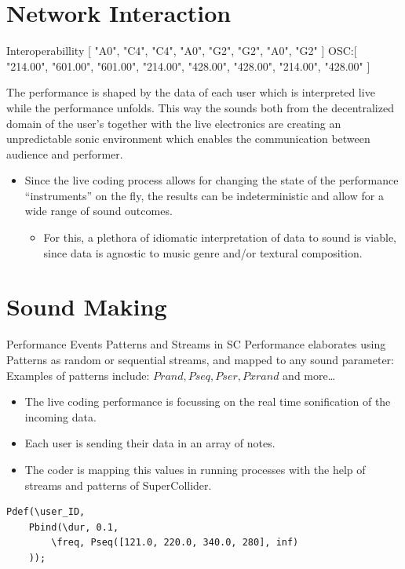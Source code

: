 \documentclass[t, 10pt, seahorse, bigger]{beamer}
\begin{document}
\section{Network Interaction}
\label{sec:orgc9b9663}
\begin{frame}[label={sec:org68b94df}]{Interoperabillity}
[ "A0", "C4", "C4", "A0", "G2", "G2", "A0", "G2" ]
OSC:[ "214.00", "601.00", "601.00", "214.00", "428.00", "428.00", "214.00", "428.00" ]

The performance is shaped by the data of each user which is interpreted live while the performance unfolds. This way the sounds both from the decentralized domain of the user's together with the live electronics are creating an unpredictable sonic environment which enables the communication between audience and performer.

\begin{itemize}
\item Since the live coding process allows for changing the state of the performance ``instruments'' on the fly, the results can be indeterministic and allow for a wide range of sound outcomes.
\begin{itemize}
\item For this, a plethora of idiomatic interpretation of data to sound is viable, since data is agnostic to music genre and/or textural composition.
\end{itemize}
\end{itemize}
\end{frame}
\section{Sound Making}
\label{sec:org3cde542}
\begin{frame}[label={sec:org9acd6cc},fragile]{Performance Events Patterns and Streams in SC}
 Performance elaborates using Patterns as random or sequential streams, and mapped to any sound parameter:
Examples of patterns include:
\(Prand, Pseq, Pser, Pxrand\)
and more\ldots{}

\begin{itemize}
\item The live coding performance is focussing on the real time sonification of the incoming data.
\item Each user is sending their data in an array of notes.
\item The coder is mapping this values in running processes with the help of streams and patterns of SuperCollider.
\end{itemize}

\begin{verbatim}
Pdef(\user_ID,
	Pbind(\dur, 0.1,
		\freq, Pseq([121.0, 220.0, 340.0, 280], inf)
	));
\end{verbatim}
\end{frame}
\end{document}
